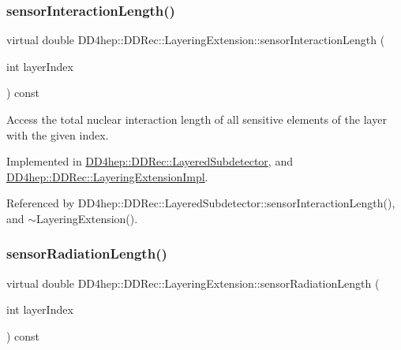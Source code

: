 \hypertarget{class_d_d4hep_1_1_d_d_rec_1_1_layering_extension_a99d3faa45e42d0a34635ea7f3ac2c038}{}\label{class_d_d4hep_1_1_d_d_rec_1_1_layering_extension_a99d3faa45e42d0a34635ea7f3ac2c038} 
\subsubsection{\texorpdfstring{sensor\+Interaction\+Length()}{sensorInteractionLength()}}
{\footnotesize\ttfamily virtual double D\+D4hep\+::\+D\+D\+Rec\+::\+Layering\+Extension\+::sensor\+Interaction\+Length (\begin{DoxyParamCaption}\item[{int}]{layer\+Index }\end{DoxyParamCaption}) const\hspace{0.3cm}{\ttfamily [pure virtual]}}



Access the total nuclear interaction length of all sensitive elements of the layer with the given index. 



Implemented in \hyperlink{class_d_d4hep_1_1_d_d_rec_1_1_layered_subdetector_a75e890bc57b982ab0c8b50bf105bd823}{D\+D4hep\+::\+D\+D\+Rec\+::\+Layered\+Subdetector}, and \hyperlink{class_d_d4hep_1_1_d_d_rec_1_1_layering_extension_impl_ad62fb142713ee5a290b3a7386c3dcd6e}{D\+D4hep\+::\+D\+D\+Rec\+::\+Layering\+Extension\+Impl}.



Referenced by D\+D4hep\+::\+D\+D\+Rec\+::\+Layered\+Subdetector\+::sensor\+Interaction\+Length(), and $\sim$\+Layering\+Extension().

\hypertarget{class_d_d4hep_1_1_d_d_rec_1_1_layering_extension_a1328587b943abe82353de131d9fac071}{}\label{class_d_d4hep_1_1_d_d_rec_1_1_layering_extension_a1328587b943abe82353de131d9fac071} 
\subsubsection{\texorpdfstring{sensor\+Radiation\+Length()}{sensorRadiationLength()}}
{\footnotesize\ttfamily virtual double D\+D4hep\+::\+D\+D\+Rec\+::\+Layering\+Extension\+::sensor\+Radiation\+Length (\begin{DoxyParamCaption}\item[{int}]{layer\+Index }\end{DoxyParamCaption}) const\hspace{0.3cm}{\ttfamily [pure virtual]}}



